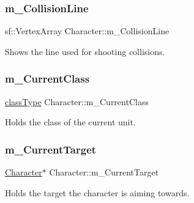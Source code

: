 \subsubsection{\texorpdfstring{m\+\_\+\+Collision\+Line}{m\_CollisionLine}}
{\footnotesize\ttfamily sf\+::\+Vertex\+Array Character\+::m\+\_\+\+Collision\+Line\hspace{0.3cm}{\ttfamily [private]}}



Shows the line used for shooting collisions. 

\mbox{\label{class_character_aa130143524b553ddf116e0d4077bcdec}} 
\subsubsection{\texorpdfstring{m\+\_\+\+Current\+Class}{m\_CurrentClass}}
{\footnotesize\ttfamily \hyperlink{_weapon_8h_ab84a9103ee8e782337e098ae19af7a29}{class\+Type} Character\+::m\+\_\+\+Current\+Class\hspace{0.3cm}{\ttfamily [private]}}



Holds the class of the current unit. 

\mbox{\label{class_character_ad9a0c6940df7fc13abd6ac2404b058b3}} 
\subsubsection{\texorpdfstring{m\+\_\+\+Current\+Target}{m\_CurrentTarget}}
{\footnotesize\ttfamily \hyperlink{class_character}{Character}$\ast$ Character\+::m\+\_\+\+Current\+Target\hspace{0.3cm}{\ttfamily [private]}}



Holds the target the character is aiming towards. 

\mbox{\label{class_character_acf5fccc444e86f4c3d41557af8e2dd47}} 
